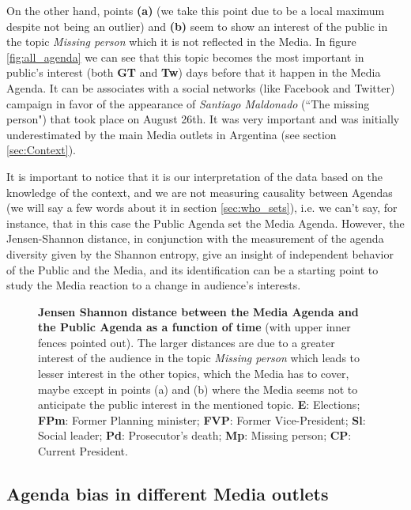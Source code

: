 \documentclass[10pt,letterpaper]{article}
\begin{document}
\par On the other hand,  points \textbf{(a)} (we take this point due to be a local maximum despite not being an outlier) and \textbf{(b)} seem to show an interest of the public in the topic \emph{Missing person} which it is not reflected in the Media.  In figure \ref{fig:all_agenda} we can see that this topic becomes the most important in public's interest (both \textbf{GT} and \textbf{Tw}) days before that  it happen in the Media Agenda. It can be associates  with a social networks (like Facebook and Twitter) campaign  in favor  of the appearance of \emph{Santiago Maldonado} (``The missing person") that took place on  August 26th. It was very important and was initially underestimated by the main Media outlets in Argentina (see section \ref{sec:Context}). 

\par It is important to notice that it is our interpretation of the data based on the knowledge of the context, and  we are not measuring causality between Agendas (we will say a few words about it in section \ref{sec:who_sets}), i.e. we can't say, for instance, that in this case the Public Agenda set the Media Agenda. 
However, the Jensen-Shannon distance, in conjunction with the measurement of the agenda diversity given by the Shannon entropy, give an insight of independent behavior of the Public and the Media, and its identification can be a starting point to study the Media reaction to a change in audience's interests.
 
\begin{figure}[h!]
\centering
\caption{\textbf{Jensen Shannon distance between the Media Agenda and the Public Agenda as a function of time} (with upper inner fences pointed out). The larger distances are due to a greater interest of the audience in the topic \emph{Missing person} which leads to lesser interest in the other topics, which the Media has to cover, maybe except in points (a) and (b) where the Media seems not to anticipate the public interest in the mentioned topic. \textbf{E}: Elections; \textbf{FPm}: Former Planning minister; \textbf{FVP}: Former Vice-President; \textbf{Sl}: Social leader; \textbf{Pd}: Prosecutor's death; \textbf{Mp}: Missing person; \textbf{CP}: Current President.}
\label{fig:jensen_shannon_gt}
\end{figure}


\subsection*{Agenda bias in different Media outlets}
\end{document}
